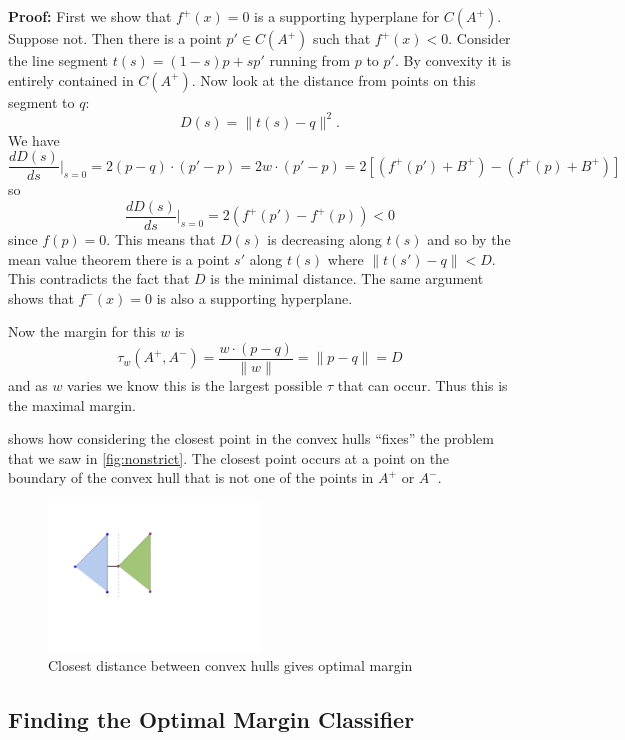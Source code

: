 \documentclass[
]{article}
\begin{document}
\textbf{Proof:} First we show that \(f^{+}(x)=0\) is a supporting
hyperplane for \(C(A^{+})\). Suppose not. Then there is a point
\(p'\in C(A^{+})\) such that \(f^{+}(x)<0\). Consider the line segment
\(t(s) = (1-s)p+sp'\) running from \(p\) to \(p'\). By convexity it is
entirely contained in \(C(A^{+})\). Now look at the distance from points
on this segment to \(q\): \[
D(s)=\|t(s)-q\|^2.
\] We have \[
\frac{dD(s)}{ds}|_{s=0} = 2(p-q)\cdot (p'-p) = 2w\cdot (p'-p) = 2\left[(f^{+}(p')+B^{+})-(f^{+}(p)+B^{+})\right]
\] so \[
\frac{dD(s)}{ds}|_{s=0} = 2(f^{+}(p')-f^{+}(p))<0
\] since \(f(p)=0\). This means that \(D(s)\) is decreasing along
\(t(s)\) and so by the mean value theorem there is a point \(s'\) along
\(t(s)\) where \(\|t(s')-q\|<D\). This contradicts the fact that \(D\)
is the minimal distance. The same argument shows that \(f^{-}(x)=0\) is
also a supporting hyperplane.

Now the margin for this \(w\) is \[
\tau_{w}(A^{+},A^{-}) = \frac{w\cdot (p-q)}{\|w\|} = \|p-q\|=D
\] and as \(w\) varies we know this is the largest possible \(\tau\)
that can occur. Thus this is the maximal margin.

 shows how considering the closest point in the convex
hulls ``fixes'' the problem that we saw in \cref{fig:nonstrict}. The
closest point occurs at a point on the boundary of the convex hull that
is not one of the points in \(A^{+}\) or \(A^{-}\).

\begin{figure}
\hypertarget{fig:strict}{%
\centering
\includegraphics[width=0.5\textwidth,height=\textheight]{../img/ConvexHullWithMargin.png}
\caption{Closest distance between convex hulls gives optimal
margin}\label{fig:strict}
}
\end{figure}

\hypertarget{finding-the-optimal-margin-classifier}{%
\subsection{Finding the Optimal Margin
Classifier}\label{finding-the-optimal-margin-classifier}}
\end{document}
